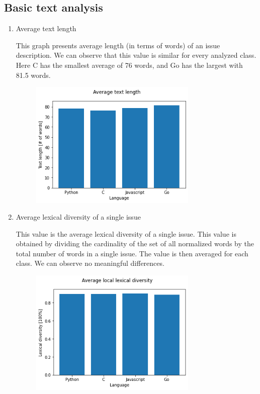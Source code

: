 \documentclass[]{article}
\begin{document}
\subsection{Basic text analysis}

\begin{enumerate}
    \item Average text length

          This graph presents average length (in terms of words) of an issue description. We can observe that this value is similar for every analyzed class. Here C has the smallest average of 76 words, and Go has the largest with 81.5 words.


          \begin{figure}[H]
              \includegraphics[width=8cm]{avg_len.png}
              \centering
          \end{figure}

    \item Average lexical diversity of a single issue

          This value is the average lexical diversity of a single issue. This value is obtained by dividing the cardinality of the set of all normalized words by the total number of words in a single issue. The value is then averaged for each class. We can observe no meaningful differences.

          \begin{figure}[H]
              \includegraphics[width=8cm]{lex_div_single.png}
              \centering
          \end{figure}


\end{enumerate}
\end{document}
